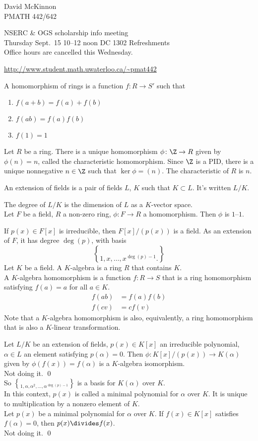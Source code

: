 David McKinnon \\
PMATH 442/642

NSERC \& OGS scholarship info meeting \\
Thursday Sept.\ 15 10--12 noon DC 1302 Refreshments \\
Office hours are cancelled this Wednesday.

\url{http://www.student.math.uwaterloo.ca/~pmat442}

 A homomorphism of rings is a function $f\colon R\to S'$ such that
\begin{enumerate}
\item $f(a+b)=f(a)+f(b)$
\item $f(ab)=f(a)f(b)$
\item $f(1)=1$
\end{enumerate}
 Let $R$ be a ring.  There is a unique homomorphism $\phi\colon\Z\to R$ given by $\phi(n)=n$, called the characteristic homomorphism.  Since $\Z$ is a PID, there is a unique nonnegative $n\in\Z$ such that $\ker\phi=(n)$.  The characteristic of $R$ is $n$. %

 An extension of fields is a pair of fields $L$, $K$ such that $K\subset L$.  It's written $L/K$.

The degree of $L/K$ is the dimension of $L$ as a $K$-vector space. \\
\recall Let $F$ be a field, $R$ a non-zero ring, $\phi\colon F\to R$ a homomorphism.  Then $\phi$ is $1$--$1$.

If $p(x)\in F[x]$ is irreducible, then $F[x]/(p(x))$ is a field.  As an extension of $F$, it has degree $\deg(p)$, with basis
\[ \brace{1,x,\dotsc,x^{\deg(p)-1}} . \]
 Let $K$ be a field.  A $K$-algebra is a ring $R$ that contains $K$. \\
 A $K$-algebra homomorphism is a function $f\colon R\to S$ that is a ring homomorphism satisfying $f(a)=a$ for all $a\in K$.
\begin{align*}
 f(ab) &= f(a)f(b) \\
 f(cv) &= cf(v)
\end{align*}
Note that a $K$-algebra homomorphism is also, equivalently, a ring homomorphism that is also a $K$-linear transformation.

\thm Let $L/K$ be an extension of fields, $p(x)\in K[x]$ an irreducible polynomial, $\alpha\in L$ an element satisfying $p(\alpha)=0$.  Then $\phi\colon K[x]/(p(x))\to K(\alpha)$ given by $\phi(f(x))=f(\alpha)$ is a $K$-algebra isomorphism. \\
\pf Not doing it. \qed \\
So $\brace{1,\alpha,\alpha^2,\dotsc,\alpha^{\deg(p)-1}}$ is a basis for $K(\alpha)$ over $K$. \\
 In this context, $p(x)$ is called a minimal polynomial for $\alpha$ over $K$.  It is unique to multiplication by a nonzero element of $K$. \\
\thm Let $p(x)$ be a minimal polynomial for $\alpha$ over $K$.  If $f(x)\in K[x]$ satisfies $f(\alpha)=0$, then $p(x)\divides f(x)$. \\
\pf Not doing it. \qed
